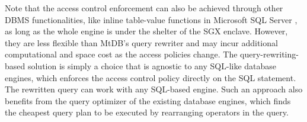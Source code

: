 \documentclass[conference]{IEEEtran}
\newcommand{\seokki}[1]{ {\color{orange}{#1}}}
\newcommand{\ours}{\xspace MtDB\xspace}
\begin{document}
Note that the access control enforcement can also be achieved through other DBMS functionalities, like inline table-value functions in Microsoft SQL Server \cite{MicrosoftRowLevelSecurity}, as long as the whole engine is under the shelter of the SGX enclave. 
However, they are less flexible than \ours's query rewriter and may incur additional computational and space cost as the access policies change.
The query-rewriting-based solution is simply a choice that is agnostic to any SQL-like database engines, which enforces the access control policy directly on the SQL statement. The rewritten query can work with any SQL-based engine. 
Such an approach also benefits from the query optimizer of the existing database engines, which finds the cheapest query plan to be executed by rearranging operators in the query.





\end{document}
